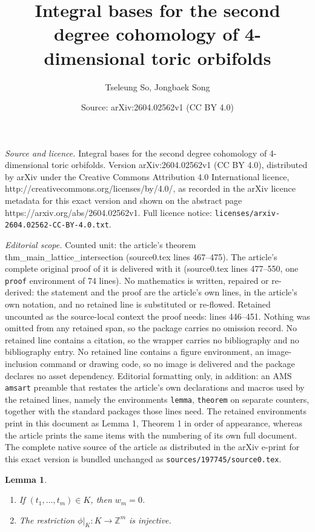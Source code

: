 \documentclass[10pt,a4paper]{amsart}
\title{Integral bases for the second degree cohomology of 4-dimensional toric orbifolds}
\author{Tseleung So, Jongbaek Song}
\date{Source: arXiv:2604.02562v1 (CC BY 4.0)}
\newtheorem{lemma}{Lemma}
\newcommand{\ZZ}{\mathbb{Z}}
\begin{document}
\maketitle

\noindent\emph{Source and licence.} Integral bases for the second degree cohomology of 4-dimensional toric orbifolds. Version arXiv:2604.02562v1 (CC BY 4.0), distributed by arXiv under the Creative Commons Attribution 4.0 International licence, http://creativecommons.org/licenses/by/4.0/, as recorded in the arXiv licence metadata for this exact version and shown on the abstract page https://arxiv.org/abs/2604.02562v1. Full licence notice: \texttt{licenses/arxiv-2604.02562-CC-BY-4.0.txt}.\par\smallskip

\noindent\textit{Editorial scope.} Counted unit: the article's theorem thm\_main\_lattice\_intersection (source0.tex lines 467--475). The article's complete original proof of it is delivered with it (source0.tex lines 477--550, one \texttt{proof} environment of 74 lines). No mathematics is written, repaired or re-derived: the statement and the proof are the article's own lines, in the article's own notation, and no retained line is substituted or re-flowed.  Retained uncounted as the source-local context the proof needs: lines 446--451.  Nothing was omitted from any retained span, so the package carries no omission record.  No retained line contains a citation, so the wrapper carries no bibliography and no bibliography entry.  No retained line contains a figure environment, an image-inclusion command or drawing code, so no image is delivered and the package declares no asset dependency.  Editorial formatting only, in addition: an AMS \texttt{amsart} preamble that restates the article's own declarations and macros used by the retained lines, namely the environments \texttt{lemma}, \texttt{theorem} on separate counters, together with the standard packages those lines need.  The retained environments print in this document as Lemma 1, Theorem 1 in order of appearance, whereas the article prints the same items with the numbering of its own full document.  The complete native source of the article as distributed in the arXiv e-print for this exact version is bundled unchanged as \texttt{sources/197745/source0.tex}.
\begin{lemma}\label{lem_w_m_0}
\begin{enumerate}
    \item If $(t_1, \dots, t_m)\in K$, then $w_m=0$. 
    \item The restriction $\phi|_K \colon K \to \ZZ^m$ is injective. 
\end{enumerate}
\end{lemma}
\end{document}
